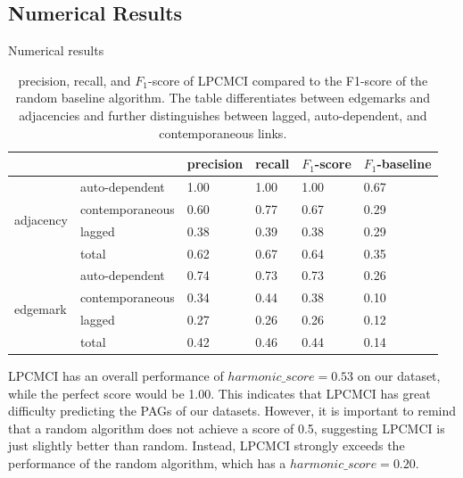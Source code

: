 \documentclass[conference]{IEEEtran}
\begin{document}
\subsection{Numerical Results}
\begin{table}[!htb]
\begin{center}
        \caption{Numerical results}
        \caption[]{precision, recall, and $F_1$-score of LPCMCI compared to the F1-score of the random baseline algorithm. The table differentiates between edgemarks and adjacencies and further distinguishes between lagged, auto-dependent, and contemporaneous links.}
      \centering
        \begin{tabular}{@{}llllll@{}}
            \toprule
            \textbf{}                  & & precision        & recall  &  $F_1$-score & $F_1$-baseline    \\ \midrule
            \multirow{4}{*}{adjacency} & auto-dependent     & 1.00             & 1.00  &  1.00     & 0.67     \\
                                       & contemporaneous    & 0.60             & 0.77  &  0.67     & 0.29     \\
                                       & lagged             & 0.38             & 0.39  &  0.38     & 0.29     \\
                                       & total              & 0.62             & 0.67  &  0.64     & 0.35     \\ \midrule
            \multirow{4}{*}{edgemark}  & auto-dependent     & 0.74             & 0.73  &  0.73     & 0.26     \\
                                       & contemporaneous    & 0.34             & 0.44  &  0.38     & 0.10     \\
                                       & lagged             & 0.27             & 0.26  &  0.26     & 0.12      \\
                                       & total              & 0.42             & 0.46  &  0.44     & 0.14     \\ 
            \end{tabular}
            \label{tab:precision_recall}
    \end{center}
\end{table}
LPCMCI has an overall performance of $harmonic\_score = 0.53$ on our dataset, while the perfect score would be 1.00. This indicates that LPCMCI has great difficulty predicting the PAGs of our datasets. However, it is important to remind that a random algorithm does not achieve a score of 0.5, suggesting LPCMCI is just slightly better than random. Instead, LPCMCI strongly exceeds the performance of the random algorithm, which has a $harmonic\_score = 0.20$. 
\end{document}
